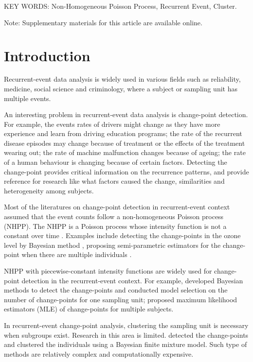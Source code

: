 \documentclass[12pt]{article}
\begin{document}
\noindent KEY WORDS: {Non-Homogeneous Poisson Process, Recurrent Event, Cluster.}

Note: Supplementary materials for this article are available online.
\section{Introduction}

Recurrent-event data analysis is widely used in various fields such as reliability, medicine, social science and criminology, where a subject or sampling unit has multiple events. 

An interesting problem in recurrent-event data analysis is change-point detection. For example, the events rates of drivers might change as they have more experience and learn from driving education programs; the rate of the recurrent disease episodes may change because of treatment or the effects of the treatment wearing out; the rate of machine malfunction changes because of ageing; the rate of a human behaviour is changing because of certain factors. Detecting the change-point provides critical information on the recurrence patterns, and provide reference for research like what factors caused the change, similarities and heterogeneity among subjects.  

Most of the literatures on change-point detection in recurrent-event context assumed that the event counts follow a non-homogeneous Poisson process (NHPP). The NHPP is a Poisson process whose intensity function is not a constant over time \citep[p.~32]{Ross2006}. Examples include  detecting the change-points in the ozone level by Bayesian method \citep{Cruz2016}, proposing semi-parametric estimators for the change-point when there are multiple individuals \citep{Frobish2016}. 

NHPP with piecewise-constant intensity functions are widely used for change-point detection in the recurrent-event context. For example, \citet{Raftery1986,West1997, Aschar2007, Gupta2015, Montoya2017} developed Bayesian methods to detect the change-points and conducted model selection on the number of change-points for one sampling unit;  \citet{Frobish2009,Li2017b} proposed maximum likelihood estimators (MLE) of change-points for multiple subjects. 

In recurrent-event change-point analysis, clustering the sampling unit is necessary when subgroups exist. Research in this area is limited. \citet{Li2017a} detected the change-points and clustered the individuals using a Bayesian finite mixture model. Such type of methods are relatively complex and computationally expensive.
\end{document}
